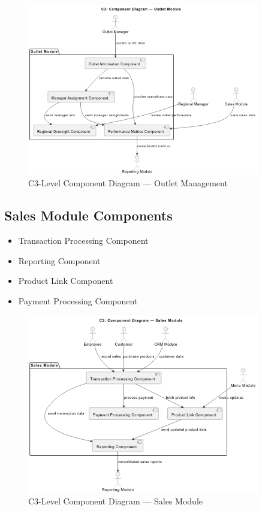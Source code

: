\begin{figure}[H]
\centering
\includegraphics[width=0.9\textwidth,keepaspectratio]{diagrams/C3_outlet.png}
\caption{C3-Level Component Diagram — Outlet Management}
\end{figure}

\subsection*{Sales Module Components}
\begin{itemize}
    \item Transaction Processing Component
    \item Reporting Component
    \item Product Link Component
    \item Payment Processing Component
\end{itemize}

\begin{figure}[H]
\centering
\includegraphics[width=0.9\textwidth,keepaspectratio]{diagrams/C3_sales.png}
\caption{C3-Level Component Diagram — Sales Module}
\end{figure}

